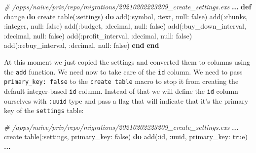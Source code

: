 \documentclass[
  oneside]{book}
\newenvironment{Shaded}{\begin{snugshade}}{\end{snugshade}}
\newcommand{\CommentTok}[1]{\textcolor[rgb]{0.56,0.35,0.01}{\textit{#1}}}
\newcommand{\ConstantTok}[1]{\textcolor[rgb]{0.00,0.00,0.00}{#1}}
\newcommand{\KeywordTok}[1]{\textcolor[rgb]{0.13,0.29,0.53}{\textbf{#1}}}
\newcommand{\NormalTok}[1]{#1}
\newcommand{\OperatorTok}[1]{\textcolor[rgb]{0.81,0.36,0.00}{\textbf{#1}}}
\newcommand{\VariableTok}[1]{\textcolor[rgb]{0.00,0.00,0.00}{#1}}
\begin{document}
\begin{Shaded}
\begin{Highlighting}[]
\CommentTok{\# /apps/naive/priv/repo/migrations/20210202223209\_create\_settings.exs}
\OperatorTok{...}
  \KeywordTok{def}\NormalTok{ change }\KeywordTok{do}
\NormalTok{    create table(}\VariableTok{:settings}\NormalTok{) }\KeywordTok{do}
\NormalTok{      add(}\VariableTok{:symbol}\NormalTok{, }\VariableTok{:text}\NormalTok{, }\VariableTok{null:} \ConstantTok{false}\NormalTok{)}
\NormalTok{      add(}\VariableTok{:chunks}\NormalTok{, }\VariableTok{:integer}\NormalTok{, }\VariableTok{null:} \ConstantTok{false}\NormalTok{)}
\NormalTok{      add(}\VariableTok{:budget}\NormalTok{, }\VariableTok{:decimal}\NormalTok{, }\VariableTok{null:} \ConstantTok{false}\NormalTok{)}
\NormalTok{      add(}\VariableTok{:buy\_down\_interval}\NormalTok{, }\VariableTok{:decimal}\NormalTok{, }\VariableTok{null:} \ConstantTok{false}\NormalTok{)}
\NormalTok{      add(}\VariableTok{:profit\_interval}\NormalTok{, }\VariableTok{:decimal}\NormalTok{, }\VariableTok{null:} \ConstantTok{false}\NormalTok{)}
\NormalTok{      add(}\VariableTok{:rebuy\_interval}\NormalTok{, }\VariableTok{:decimal}\NormalTok{, }\VariableTok{null:} \ConstantTok{false}\NormalTok{)}
    \KeywordTok{end}
  \KeywordTok{end}
\end{Highlighting}
\end{Shaded}

At this moment we just copied the settings and converted them to columns using the \texttt{add} function. We need now to take care of the \texttt{id} column. We need to pass \texttt{primary\_key:\ false} to the \texttt{create\ table} macro to stop it from creating the default integer-based \texttt{id} column. Instead of that we will define the \texttt{id} column ourselves with \texttt{:uuid} type and pass a flag that will indicate that it's the primary key of the \texttt{settings} table:

\begin{Shaded}
\begin{Highlighting}[]
\CommentTok{\# /apps/naive/priv/repo/migrations/20210202223209\_create\_settings.exs}
\OperatorTok{...}
\NormalTok{    create table(}\VariableTok{:settings}\NormalTok{, }\VariableTok{primary\_key:} \ConstantTok{false}\NormalTok{) }\KeywordTok{do}
\NormalTok{      add(}\VariableTok{:id}\NormalTok{, }\VariableTok{:uuid}\NormalTok{, }\VariableTok{primary\_key:} \ConstantTok{true}\NormalTok{)}
      \OperatorTok{...}
\end{Highlighting}
\end{Shaded}
\end{document}
